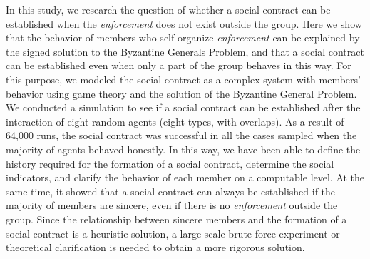 In this study, we research the question of whether a social contract can be established 
when the \emph{enforcement} does not exist outside the group.
Here we show that the behavior of members who self-organize \emph{enforcement} can be explained 
by the signed solution to the Byzantine Generals Problem\cite{lamport1982}, 
and that a social contract can be established even when only a part of the group behaves in this way.
For this purpose, we modeled the social contract as a complex system with members' behavior 
using game theory and the solution of the Byzantine General Problem. 
We conducted a simulation to see if a social contract can be established 
after the interaction of eight random agents (eight types, with overlaps).
As a result of 64,000 runs, the social contract was successful in all the cases sampled 
when the majority of agents behaved honestly.
In this way, we have been able to define the history required for the formation of a social contract, 
determine the social indicators, and clarify the behavior of each member on a computable level. At the same time, 
it showed that a social contract can always be established if the majority of members are sincere, 
even if there is no \emph{enforcement} outside the group.
Since the relationship between sincere members and the formation of a social contract is a heuristic solution, 
a large-scale brute force experiment or theoretical clarification is needed to obtain a more rigorous solution.
